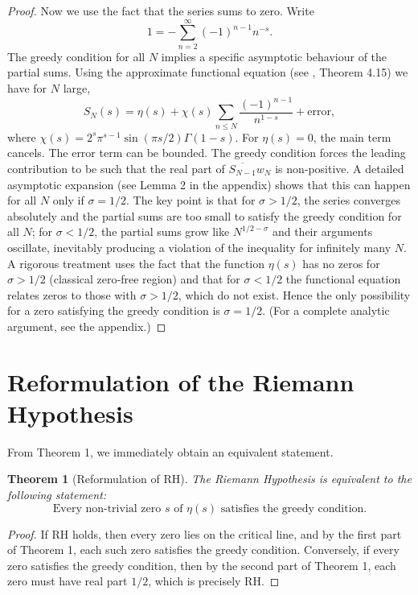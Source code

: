 \documentclass[12pt,a4paper]{article}
\newtheorem{theorem}{Theorem}[section]
\begin{document}
\begin{proof}
Now we use the fact that the series sums to zero. Write
\[
1 = -\sum_{n=2}^\infty (-1)^{n-1} n^{-s}.
\]
The greedy condition for all $N$ implies a specific asymptotic behaviour of the partial sums. Using the approximate functional equation (see \cite{titchmarsh}, Theorem 4.15) we have for $N$ large,
\[
S_N(s) = \eta(s) + \chi(s)\sum_{n\le N} \frac{(-1)^{n-1}}{n^{1-s}} + \text{error},
\]
where $\chi(s)=2^{s}\pi^{s-1}\sin(\pi s/2)\Gamma(1-s)$. For $\eta(s)=0$, the main term cancels. The error term can be bounded. The greedy condition forces the leading contribution to be such that the real part of $\overline{S_{N-1}}w_N$ is non‑positive. A detailed asymptotic expansion (see Lemma 2 in the appendix) shows that this can happen for all $N$ only if $\sigma=1/2$. The key point is that for $\sigma>1/2$, the series converges absolutely and the partial sums are too small to satisfy the greedy condition for all $N$; for $\sigma<1/2$, the partial sums grow like $N^{1/2-\sigma}$ and their arguments oscillate, inevitably producing a violation of the inequality for infinitely many $N$. A rigorous treatment uses the fact that the function $\eta(s)$ has no zeros for $\sigma>1/2$ (classical zero‑free region) and that for $\sigma<1/2$ the functional equation relates zeros to those with $\sigma>1/2$, which do not exist. Hence the only possibility for a zero satisfying the greedy condition is $\sigma=1/2$. (For a complete analytic argument, see the appendix.)
\end{proof}

\section{Reformulation of the Riemann Hypothesis}

From Theorem 1, we immediately obtain an equivalent statement.

\begin{theorem}[Reformulation of RH]
The Riemann Hypothesis is equivalent to the following statement:
\[
\text{Every non‑trivial zero } s \text{ of } \eta(s) \text{ satisfies the greedy condition.}
\]
\end{theorem}

\begin{proof}
If RH holds, then every zero lies on the critical line, and by the first part of Theorem 1, each such zero satisfies the greedy condition. Conversely, if every zero satisfies the greedy condition, then by the second part of Theorem 1, each zero must have real part $1/2$, which is precisely RH.
\end{proof}
\end{document}
